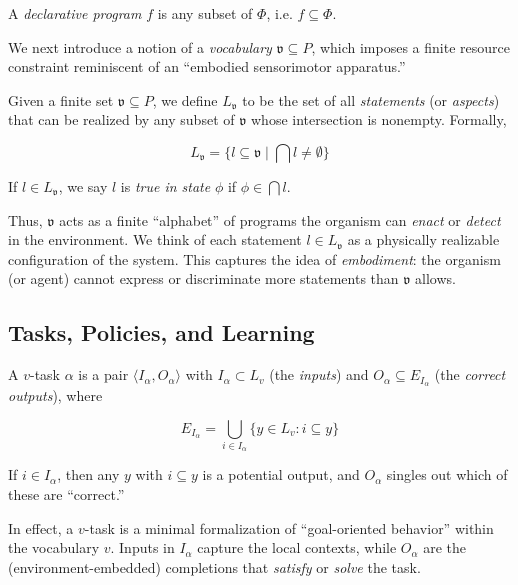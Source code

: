 \documentclass[12pt,letterpaper]{article}
\begin{document}
\begin{definition}\label{def:declarative-program}
A \textit{declarative program} $f$ is any subset of $\Phi$, i.e. $f \subseteq \Phi$.
\end{definition}

We next introduce a notion of a \textit{vocabulary} $\mathfrak{v} \subseteq P$, which imposes a finite resource constraint reminiscent of an ``embodied sensorimotor apparatus.''

\begin{definition}\label{def:abstraction-layer}
Given a finite set $\mathfrak{v} \subseteq P$, we define $L_{\mathfrak{v}}$ to be the set of all \textit{statements} (or \textit{aspects}) that can be realized by any subset of $\mathfrak{v}$ whose intersection is nonempty. Formally,

\[
   L_\mathfrak{v} = \{ l \subseteq \mathfrak{v} \mid \bigcap l \neq \emptyset \}
\]

If $l \in L_\mathfrak{v}$, we say $l$ is \textit{true in state} $\phi$ if $\phi \in \bigcap l$.
\end{definition}

Thus, $\mathfrak{v}$ acts as a finite ``alphabet'' of programs the organism can \textit{enact} or \textit{detect} in the environment. We think of each statement $l \in L_{\mathfrak{v}}$ as a physically realizable configuration of the system. This captures the idea of \textit{embodiment}: the organism (or agent) cannot express or discriminate more statements than $\mathfrak{v}$ allows.

\subsection{Tasks, Policies, and Learning}

\begin{definition}[$v$-Task]
A $v$-task $\alpha$ is a pair $\langle I_\alpha, O_\alpha\rangle$ with $I_\alpha \subset L_v$ (the \textit{inputs}) and $O_\alpha \subseteq E_{I_\alpha}$ (the \textit{correct outputs}), where

\[
   E_{I_\alpha} = \bigcup_{i \in I_\alpha} \{y \in L_v : i \subseteq y\}
\]

If $i \in I_\alpha$, then any $y$ with $i \subseteq y$ is a potential output, and $O_\alpha$ singles out which of these are ``correct.''
\end{definition}

In effect, a $v$-task is a minimal formalization of ``goal-oriented behavior'' within the vocabulary $v$. Inputs in $I_\alpha$ capture the local contexts, while $O_\alpha$ are the (environment-embedded) completions that \textit{satisfy} or \textit{solve} the task.
\end{document}
